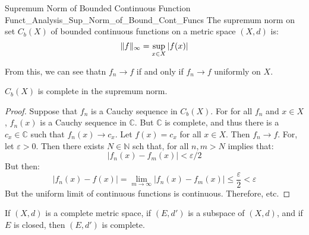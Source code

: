             \begin{ldefinition}
                  {Supremum Norm of Bounded Continuous Function}
                  {Funct_Analysis_Sup_Norm_of_Bound_Cont_Funcs}
                The supremum norm on set $C_{b}(X)$ of bounded
                continuous functions on a metric space $(X,d)$ is:
                \begin{equation}
                    \lVert f\rVert_{\infty}=\sup_{x\in{X}}|f(x)|
                \end{equation}
            \end{ldefinition}
            From this, we can see thatn $f_{n}\rightarrow{f}$ if
            and only if $f_{n}\rightarrow{f}$ uniformly on $X$.
            \begin{theorem}
                $C_{b}(X)$ is complete in the supremum norm.
            \end{theorem}
            \begin{proof}
                Suppose that $f_{n}$ is a Cauchy sequence in
                $C_{b}(X)$. For for all $f_{n}$ and $x\in{X}$,
                $f_{n}(x)$ is a Cauchy sequence in $\mathbb{C}$.
                But $\mathbb{C}$ is complete, and thus there is a
                $c_{x}\in\mathbb{C}$ such that
                $f_{n}(x)\rightarrow{c}_{x}$. Let
                $f(x)=c_{x}$ for all $x\in{X}$. Then
                $f_{n}\rightarrow{f}$. For, let $\varepsilon>0$.
                Then there exists $N\in\mathbb{N}$ sch that, for
                all $n,m>{N}$ implies that:
                \begin{equation}
                    |f_{n}(x)-f_{m}(x)|<\varepsilon/2
                \end{equation}
                But then:
                \begin{equation}
                    |f_{n}(x)-f(x)|=
                    \underset{m\rightarrow\infty}{\lim}
                    |f_{n}(x)-f_{m}(x)|
                    \leq\frac{\varepsilon}{2}<\varepsilon
                \end{equation}
                But the uniform limit of continuous functions is
                continuous. Therefore, etc.
            \end{proof}
            \begin{theorem}
                If $(X,d)$ is a complete metric space, if
                $(E,d')$ is a subspace of $(X,d)$, and if
                $E$ is closed, then $(E,d')$ is complete.
            \end{theorem}
